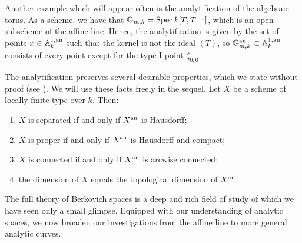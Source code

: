 Another example which will appear often is the analytification of the algebraic torus. As a scheme, we have that $\mathbb{G}_{m, k} = \operatorname{Spec} k[T, T^{-1}]$, which is an open subscheme of the affine line. Hence, the analytification is given by the set of points $x \in \mathbb{A}^{1, \text{an}}_{k}$ such that the kernel is not the ideal $(T)$, so $\mathbb{G}_{m, k}^{\text{an}} \subset \mathbb{A}^{1, \text{an}}_{k}$ consists of every point except for the type I point $\zeta_{0, 0}$.

The analytification preserves several desirable properties, which we state without proof (see \parencite[Theorem 3.4.8]{berk1}).
We will use these facts freely in the sequel.
Let $X$ be a scheme of locally finite type over $k$. 
Then:
\begin{enumerate}
    \item $X$ is separated if and only if $X^{\text{an}}$ is Hausdorff;
    \item $X$ is proper if and only if $X^{\text{an}}$ is Hausdorff and compact;
    \item $X$ is connected if and only if $X^{\text{an}}$ is arcwise connected;
    \item the dimension of $X$ equals the topological dimension of $X^{\text{an}}$.
\end{enumerate}

The full theory of Berkovich spaces is a deep and rich field of study of which we have seen only a small glimpse.
Equipped with our understanding of analytic spaces, we now broaden our investigations from the affine line to more general analytic curves.

